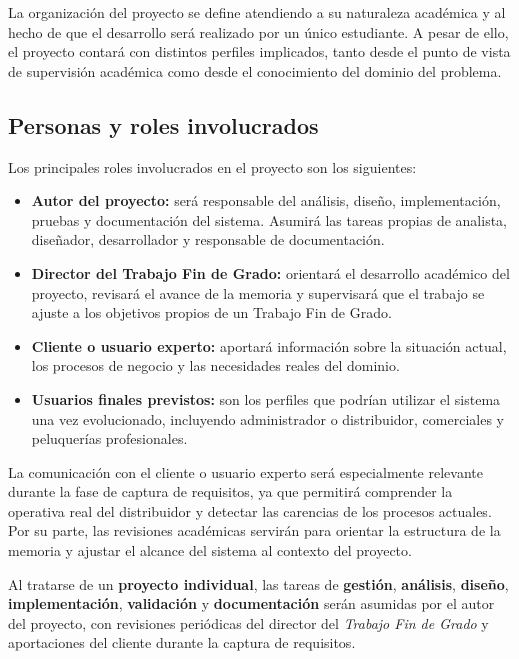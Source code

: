 La organización del proyecto se define atendiendo a su naturaleza académica y al hecho de que el desarrollo será realizado por un único estudiante. A pesar de ello, el proyecto contará con distintos perfiles implicados, tanto desde el punto de vista de supervisión académica como desde el conocimiento del dominio del problema.

\subsection{Personas y roles involucrados}

Los principales roles involucrados en el proyecto son los siguientes:

\begin{itemize}
    \item \textbf{Autor del proyecto:} será responsable del análisis, diseño, implementación, pruebas y documentación del sistema. Asumirá las tareas propias de analista, diseñador, desarrollador y responsable de documentación.
    \item \textbf{Director del Trabajo Fin de Grado:} orientará el desarrollo académico del proyecto, revisará el avance de la memoria y supervisará que el trabajo se ajuste a los objetivos propios de un Trabajo Fin de Grado.
    \item \textbf{Cliente o usuario experto:} aportará información sobre la situación actual, los procesos de negocio y las necesidades reales del dominio.
    \item \textbf{Usuarios finales previstos:} son los perfiles que podrían utilizar el sistema una vez evolucionado, incluyendo administrador o distribuidor, comerciales y peluquerías profesionales.
\end{itemize}

La comunicación con el cliente o usuario experto será especialmente relevante durante la fase de captura de requisitos, ya que permitirá comprender la operativa real del distribuidor y detectar las carencias de los procesos actuales. Por su parte, las revisiones académicas servirán para orientar la estructura de la memoria y ajustar el alcance del sistema al contexto del proyecto.

Al tratarse de un \textbf{proyecto individual}, las tareas de \textbf{gestión}, \textbf{análisis}, \textbf{diseño}, \textbf{implementación}, \textbf{validación} y \textbf{documentación} serán asumidas por el autor del proyecto, con revisiones periódicas del director del \textit{Trabajo Fin de Grado} y aportaciones del cliente durante la captura de requisitos.

